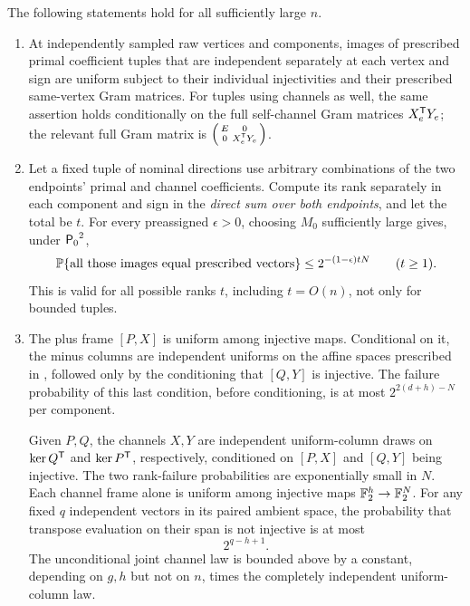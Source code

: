 \begin{lemma}\label{lem:frame-images}
The following statements hold for all sufficiently large \(n\).
\begin{enumerate}[label=\textup{(\alph*)}]
\item
At independently sampled raw vertices and components, images of prescribed primal coefficient tuples that are independent separately at each vertex and sign are uniform subject to their individual injectivities and their prescribed same-vertex Gram matrices.
For tuples using channels as well, the same assertion holds conditionally on the full self-channel Gram matrices \(X_e^{\mathsf T} Y_e\); the relevant full Gram matrix is
\(\begin{psmallmatrix}E&0\\0&X_e^{\mathsf T} Y_e\end{psmallmatrix}\).

\item
Let a fixed tuple of nominal directions use arbitrary combinations of the two endpoints' primal and channel coefficients.
Compute its rank separately in each component and sign in the \emph{direct sum over both endpoints}, and let the total be \(t\).
For every preassigned \(\epsilon>0\), choosing \(M_0\) sufficiently large gives, under \({\mathsf P_0}^2\),
\begin{equation}\label{eq:reference-image-cap}
 \mathbb P\{\text{all those images equal prescribed vectors}\}
 \le 2^{-(1-\epsilon)tN}\qquad(t\ge1).
\end{equation}
This is valid for all possible ranks \(t\), including \(t=O(n)\), not only for bounded tuples.

\item
The plus frame \([P,X]\) is uniform among injective maps.
Conditional on it, the minus columns are independent uniforms on the affine spaces prescribed in , followed only by the conditioning that \([Q,Y]\) is injective.
The failure probability of this last condition, before conditioning, is at most \(2^{2(d+h)-N}\) per component.

Given \(P,Q\), the channels \(X,Y\) are independent uniform-column draws on \(\ker Q^{\mathsf T}\) and \(\ker P^{\mathsf T}\), respectively, conditioned on \([P,X]\) and \([Q,Y]\) being injective.
The two rank-failure probabilities are exponentially small in \(N\).
Each channel frame alone is uniform among injective maps \(\mathbb F_2^h\to\mathbb F_2^N\).
For any fixed \(q\) independent vectors in its paired ambient space, the probability that transpose evaluation on their span is not injective is at most
\begin{equation}\label{eq:channel-transpose-failure}
 2^{q-h+1}.
\end{equation}
The unconditional joint channel law is bounded above by a constant, depending on \(g,h\) but not on \(n\), times the completely independent uniform-column law.


\end{enumerate}
\end{lemma}
